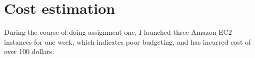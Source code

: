 \section{Cost estimation}
\label{section:cost}

During the course of doing assignment one, I launched three Amazon EC2 instances for one week, which indicates poor budgeting, and has incurred cost of over 100 dollars.
